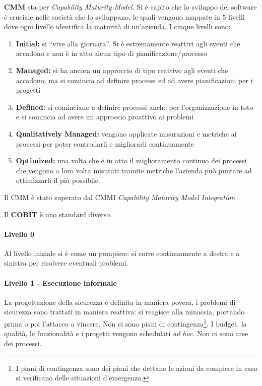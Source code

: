 \textbf{CMM} sta per \textit{Capability Maturity Model}. Si è capito che lo 
sviluppo del software è cruciale nelle società che lo sviluppano, le quali vengono 
mappate in 5 livelli dove ogni livello identifica la maturità di un'azienda.
I cinque livelli sono:
\begin{enumerate}
 \item \textbf{Initial:} si ``vive alla giornata''. Si è estremamente reattivi agli 
eventi che accadono e non è in atto alcun tipo di pianificazione/processo
 \item \textbf{Managed:} si ha ancora un approccio di tipo reattivo agli eventi che 
accadono, ma si comincia ad definire processi ed ad avere pianificazioni per i 
progetti
 \item \textbf{Defined:} si cominciano a definire processi anche per l'organizzazione in 
toto e si comincia ad avere un approccio proattivo ai problemi
 \item \textbf{Qualitatively Managed:} vengono applicate misurazioni e metriche ai 
processi per poter controllarli e migliorarli continuamente
 \item \textbf{Optimized:} una volta che è in atto il miglioramento continuo dei 
processi che vengono a loro volta misurati tramite metriche l'azienda può 
puntare ad ottimizzarli il più possibile.
\end{enumerate}
Il CMM è stato superato dal CMMI \textit{Capability Maturity Model Integration}


Il \textbf{COBIT} è uno standard diverso.


\paragraph{Livello 0}

Al livello iniziale si è come un pompiere: si corre continuamente a destra e a 
sinistra per risolvere eventuali problemi.

\paragraph{Livello 1 - Esecuzione informale}

La progettazione della sicurezza è definita in maniera povera, i problemi di 
sicurezza sono trattati in maniera reattiva: si reagisce 
alla minaccia, portando prima o poi l'attacco a vincere. Non ci sono piani di 
contingenza\footnote{I piani di contingenza sono dei piani che dettano le azioni 
da compiere in caso si verificano delle situazioni d'emergenza.}. I budget, la 
qualità, le funzionalità e i progetti vengono schedulati \textit{ad hoc}.
Non ci sono aree dei processi.

